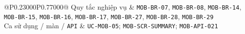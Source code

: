 \begin{longtable}{@{}P{0.23000\SRSWidth}P{0.77000\SRSWidth}@{}}
Quy tắc nghiệp vụ & \texttt{MOB-\allowbreak{}BR-\allowbreak{}07}, \texttt{MOB-\allowbreak{}BR-\allowbreak{}08}, \texttt{MOB-\allowbreak{}BR-\allowbreak{}14}, \texttt{MOB-\allowbreak{}BR-\allowbreak{}15}, \texttt{MOB-\allowbreak{}BR-\allowbreak{}16}, \texttt{MOB-\allowbreak{}BR-\allowbreak{}17}, \texttt{MOB-\allowbreak{}BR-\allowbreak{}27}, \texttt{MOB-\allowbreak{}BR-\allowbreak{}28}, \texttt{MOB-\allowbreak{}BR-\allowbreak{}29} \\[3pt]
Ca sử dụng /\allowbreak{} màn /\allowbreak{} \texttt{API} & \texttt{UC-\allowbreak{}MOB-\allowbreak{}05}; \texttt{MOB-\allowbreak{}SCR-\allowbreak{}SUMMARY}; \texttt{MOB-\allowbreak{}API-\allowbreak{}021} \\[3pt]
\end{longtable}
\endgroup

